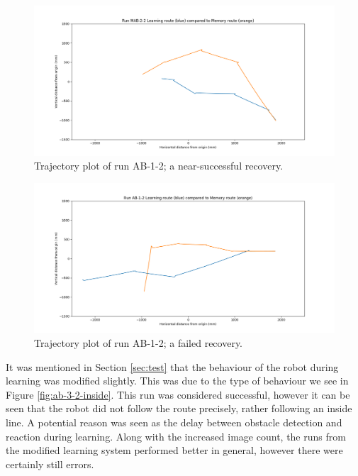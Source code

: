 \documentclass[a4paper,11pt,twoside,openright]{article}
\begin{document}
\begin{figure}
 \centering
  \includegraphics[width=\textwidth]{MAB-2-2}
  \caption{
    \label{fig:mab-2-2-succ} Trajectory plot of run AB-1-2; a near-successful recovery.
  }
\end{figure}


\begin{figure}
 \centering
  \includegraphics[width=\textwidth]{AB-1-2}
  \caption{
    \label{fig:ab-1-2-fail} Trajectory plot of run AB-1-2; a failed recovery.
  }
\end{figure}

It was mentioned in Section \ref{sec:test} that the behaviour of the robot during learning was modified slightly. This
was due to the type of behaviour we see in Figure \ref{fig:ab-3-2-inside}. This run was considered successful, however it can be seen
that the robot did not follow the route precisely, rather following an inside line. A potential reason was seen as the
delay between obstacle detection and reaction during learning. Along with the increased image count, the runs from
the modified learning system performed better in general, however there were certainly still errors.
\newline
\end{document}

